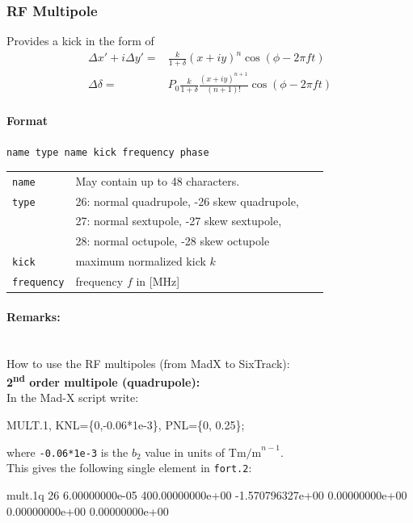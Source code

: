 \subsubsection{RF Multipole}

Provides a kick in the form of
\begin{align}
    \Delta x'+i\Delta y' =& \frac{k}{1+\delta} (x+iy)^n \cos (\phi - 2 \pi f t) \\
    \Delta \delta =& P_0 \frac{k}{1+\delta} \frac{(x+iy)^{n+1}}{(n+1)!} \cos (\phi - 2 \pi f t)
\end{align}

\paragraph{Format} \texttt{name type name kick frequency phase}

\bigskip
\begin{tabular}{@{}lp{0.8\linewidth}}
    \texttt{name} & May contain up to 48 characters. \\
    \texttt{type} & 26: normal quadrupole, -26 skew quadrupole, \\
                  & 27: normal sextupole, -27 skew sextupole, \\
                  & 28: normal octupole, -28 skew octupole \\
    \texttt{kick} & maximum normalized kick $k$ \\
    \texttt{frequency} & frequency $f$ in [MHz]
\end{tabular}

\paragraph{Remarks:}~\\
How to use the RF multipoles (from MadX to SixTrack):\\

\noindent\textbf{2\textsuperscript{nd} order multipole (quadrupole):}\\
\noindent In the Mad-X script write:
\begin{cverbatim}
MULT.1, KNL=\{0,-0.06*1e-3\}, PNL=\{0, 0.25\};
\end{cverbatim}
where \texttt{-0.06*1e-3} is the $b_2$ value in units of $\mathrm{Tm/m}^{n-1}$.\\
This gives the following single element in \texttt{fort.2}:
\begin{cverbatim}
mult.1q  26  6.00000000e-05  400.00000000e+00  -1.570796327e+00  0.00000000e+00  0.00000000e+00  0.00000000e+00
\end{cverbatim}

